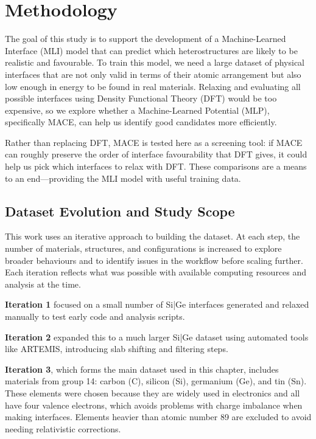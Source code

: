 \section{Methodology} \label{section:methodology}

The goal of this study is to support the development of a Machine-Learned Interface (MLI) model that can predict which heterostructures are likely to be realistic and favourable. To train this model, we need a large dataset of physical interfaces that are not only valid in terms of their atomic arrangement but also low enough in energy to be found in real materials. Relaxing and evaluating all possible interfaces using Density Functional Theory (DFT) would be too expensive, so we explore whether a Machine-Learned Potential (MLP), specifically MACE, can help us identify good candidates more efficiently.

Rather than replacing DFT, MACE is tested here as a screening tool: if MACE can roughly preserve the order of interface favourability that DFT gives, it could help us pick which interfaces to relax with DFT. These comparisons are a means to an end—providing the MLI model with useful training data.

\subsection{Dataset Evolution and Study Scope}

This work uses an iterative approach to building the dataset. At each step, the number of materials, structures, and configurations is increased to explore broader behaviours and to identify issues in the workflow before scaling further. Each iteration reflects what was possible with available computing resources and analysis at the time.

\textbf{Iteration 1} focused on a small number of Si|Ge interfaces generated and relaxed manually to test early code and analysis scripts.

\textbf{Iteration 2} expanded this to a much larger Si|Ge dataset using automated tools like ARTEMIS, introducing slab shifting and filtering steps.

\textbf{Iteration 3}, which forms the main dataset used in this chapter, includes materials from group 14: carbon (C), silicon (Si), germanium (Ge), and tin (Sn). These elements were chosen because they are widely used in electronics and all have four valence electrons, which avoids problems with charge imbalance when making interfaces. Elements heavier than atomic number 89 are excluded to avoid needing relativistic corrections.

